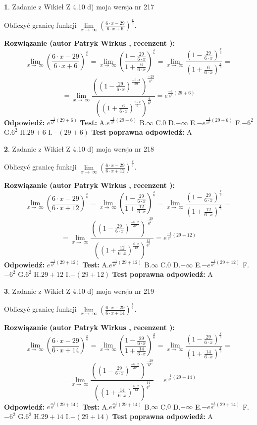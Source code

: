 \documentclass[12pt, a4paper]{article}
\theoremstyle{definition} %
\newtheorem{zad}{}
\newcommand{\zadStart}[1]{\begin{zad}#1\newline}
\newcommand{\zadStop}{\end{zad}}
\newcommand{\rozwStart}[2]{\noindent \textbf{Rozwiązanie (autor #1 , recenzent #2): }\newline}
\newcommand{\rozwStop}{\newline}
\newcommand{\odpStart}{\noindent \textbf{Odpowiedź:}\newline}
\newcommand{\odpStop}{\newline}
\newcommand{\testStart}{\noindent \textbf{Test:}\newline}
\newcommand{\testStop}{\newline}
\newcommand{\kluczStart}{\noindent \textbf{Test poprawna odpowiedź:}\newline}
\newcommand{\kluczStop}{\newline}
\begin{document}
\zadStart{Zadanie z Wikieł Z 4.10 d) moja wersja nr 217}


Obliczyć granicę funkcji  $\lim\limits_{x\to\ \infty}(\frac{6\cdot x-29}{6\cdot x+6})^{\frac{x}{6}}$.
\zadStop
\rozwStart{Patryk Wirkus}{}
$$\lim\limits_{x\to\ \infty}(\frac{6\cdot x-29}{6\cdot x+6})^{\frac{x}{6}} = \lim\limits_{x\to\ \infty}(\frac{1-\frac{29}{6\cdot x}}{1+\frac{6}{6\cdot x}})^{\frac{x}{6}}=\lim\limits_{x\to\ \infty}\frac{(1-\frac{29}{6\cdot x})^{\frac{x}{6}}}{(1+\frac{6}{6\cdot x})^{\frac{x}{6}}}=$$
$$=\lim\limits_{x\to\ \infty}\frac{((1-\frac{29}{6\cdot x})^{\frac{-6\cdot x}{29}})^{\frac{-29}{6^{2}}}}{((1+\frac{6}{6\cdot x})^{\frac{6\cdot x}{6}})^{\frac{6}{6^{2}}}}=e^{\frac{-1}{6^{2}}(29+6)}$$
\rozwStop
\odpStart
$e^{\frac{-1}{6^{2}}(29+6)}$
\odpStop
\testStart
A.$e^{\frac{-1}{6^{2}}(29+6)}$ B.$\infty$ C.$0$ D.$-\infty$ E.$-e^{\frac{-1}{6^{2}}(29+6)}$
F.$-6^{2}$ G.$6^{2}$
H.$29+6$
I.$-(29+6)$
\testStop
\kluczStart
A
\kluczStop



\zadStart{Zadanie z Wikieł Z 4.10 d) moja wersja nr 218}


Obliczyć granicę funkcji  $\lim\limits_{x\to\ \infty}(\frac{6\cdot x-29}{6\cdot x+12})^{\frac{x}{6}}$.
\zadStop
\rozwStart{Patryk Wirkus}{}
$$\lim\limits_{x\to\ \infty}(\frac{6\cdot x-29}{6\cdot x+12})^{\frac{x}{6}} = \lim\limits_{x\to\ \infty}(\frac{1-\frac{29}{6\cdot x}}{1+\frac{12}{6\cdot x}})^{\frac{x}{6}}=\lim\limits_{x\to\ \infty}\frac{(1-\frac{29}{6\cdot x})^{\frac{x}{6}}}{(1+\frac{12}{6\cdot x})^{\frac{x}{6}}}=$$
$$=\lim\limits_{x\to\ \infty}\frac{((1-\frac{29}{6\cdot x})^{\frac{-6\cdot x}{29}})^{\frac{-29}{6^{2}}}}{((1+\frac{12}{6\cdot x})^{\frac{6\cdot x}{12}})^{\frac{12}{6^{2}}}}=e^{\frac{-1}{6^{2}}(29+12)}$$
\rozwStop
\odpStart
$e^{\frac{-1}{6^{2}}(29+12)}$
\odpStop
\testStart
A.$e^{\frac{-1}{6^{2}}(29+12)}$ B.$\infty$ C.$0$ D.$-\infty$ E.$-e^{\frac{-1}{6^{2}}(29+12)}$
F.$-6^{2}$ G.$6^{2}$
H.$29+12$
I.$-(29+12)$
\testStop
\kluczStart
A
\kluczStop



\zadStart{Zadanie z Wikieł Z 4.10 d) moja wersja nr 219}


Obliczyć granicę funkcji  $\lim\limits_{x\to\ \infty}(\frac{6\cdot x-29}{6\cdot x+14})^{\frac{x}{6}}$.
\zadStop
\rozwStart{Patryk Wirkus}{}
$$\lim\limits_{x\to\ \infty}(\frac{6\cdot x-29}{6\cdot x+14})^{\frac{x}{6}} = \lim\limits_{x\to\ \infty}(\frac{1-\frac{29}{6\cdot x}}{1+\frac{14}{6\cdot x}})^{\frac{x}{6}}=\lim\limits_{x\to\ \infty}\frac{(1-\frac{29}{6\cdot x})^{\frac{x}{6}}}{(1+\frac{14}{6\cdot x})^{\frac{x}{6}}}=$$
$$=\lim\limits_{x\to\ \infty}\frac{((1-\frac{29}{6\cdot x})^{\frac{-6\cdot x}{29}})^{\frac{-29}{6^{2}}}}{((1+\frac{14}{6\cdot x})^{\frac{6\cdot x}{14}})^{\frac{14}{6^{2}}}}=e^{\frac{-1}{6^{2}}(29+14)}$$
\rozwStop
\odpStart
$e^{\frac{-1}{6^{2}}(29+14)}$
\odpStop
\testStart
A.$e^{\frac{-1}{6^{2}}(29+14)}$ B.$\infty$ C.$0$ D.$-\infty$ E.$-e^{\frac{-1}{6^{2}}(29+14)}$
F.$-6^{2}$ G.$6^{2}$
H.$29+14$
I.$-(29+14)$
\testStop
\kluczStart
A
\kluczStop
\end{document}
